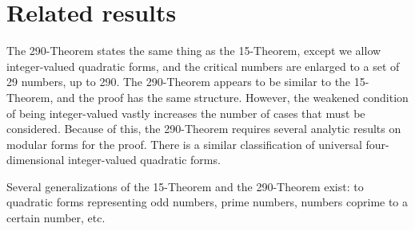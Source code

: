 \documentclass[letterpaper, 12pt]{article}
\begin{document}
\section{Related results}
The 290-Theorem states the same thing as the 15-Theorem, except we allow integer-valued quadratic forms, and the critical numbers are enlarged to a set of 29 numbers, up to 290.
The 290-Theorem appears to be similar to the 15-Theorem, and the proof has the same structure. However, the weakened condition of being integer-valued vastly increases the number of cases that must be considered. Because of this, the 290-Theorem requires several analytic results on modular forms for the proof.
There is a similar classification of universal four-dimensional integer-valued quadratic forms.

Several generalizations of the 15-Theorem and the 290-Theorem exist: to quadratic forms representing odd numbers, prime numbers, numbers coprime to a certain number, etc.
\end{document}
